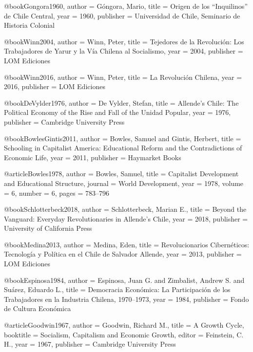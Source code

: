 @book{Gongora1960,
	author    = {G{\'o}ngora, Mario},
	title     = {Origen de los ``Inquilinos'' de {Chile} Central},
	year      = {1960},
	publisher = {Universidad de Chile, Seminario de Historia Colonial}
}

@book{Winn2004,
	author    = {Winn, Peter},
	title     = {Tejedores de la Revoluci{\'o}n: Los Trabajadores de {Yarur} y la V{\'i}a Chilena al Socialismo},
	year      = {2004},
	publisher = {LOM Ediciones}
}

@book{Winn2016,
	author    = {Winn, Peter},
	title     = {La Revoluci{\'o}n Chilena},
	year      = {2016},
	publisher = {LOM Ediciones}
}

@book{DeVylder1976,
	author    = {De Vylder, Stefan},
	title     = {Allende's {Chile}: The Political Economy of the Rise and Fall of the {Unidad Popular}},
	year      = {1976},
	publisher = {Cambridge University Press}
}

@book{BowlesGintis2011,
	author    = {Bowles, Samuel and Gintis, Herbert},
	title     = {Schooling in Capitalist America: Educational Reform and the Contradictions of Economic Life},
	year      = {2011},
	publisher = {Haymarket Books}
}

@article{Bowles1978,
	author  = {Bowles, Samuel},
	title   = {Capitalist Development and Educational Structure},
	journal = {World Development},
	year    = {1978},
	volume  = {6},
	number  = {6},
	pages   = {783--796}
}

@book{Schlotterbeck2018,
	author    = {Schlotterbeck, Marian E.},
	title     = {Beyond the Vanguard: Everyday Revolutionaries in {Allende}'s {Chile}},
	year      = {2018},
	publisher = {University of California Press}
}

@book{Medina2013,
	author    = {Medina, Eden},
	title     = {Revolucionarios Cibern{\'e}ticos: Tecnolog{\'i}a y Pol{\'i}tica en el {Chile} de {Salvador Allende}},
	year      = {2013},
	publisher = {LOM Ediciones}
}

@book{Espinosa1984,
	author    = {Espinosa, Juan G. and Zimbalist, Andrew S. and Su{\'a}rez, Eduardo L.},
	title     = {Democracia Econ{\'o}mica: La Participaci{\'o}n de los Trabajadores en la Industria Chilena, 1970--1973},
	year      = {1984},
	publisher = {Fondo de Cultura Econ{\'o}mica}
}

@article{Goodwin1967,
	author    = {Goodwin, Richard M.},
	title     = {A Growth Cycle},
	booktitle = {Socialism, Capitalism and Economic Growth},
	editor    = {Feinstein, C. H.},
	year      = {1967},
	publisher = {Cambridge University Press}
}

